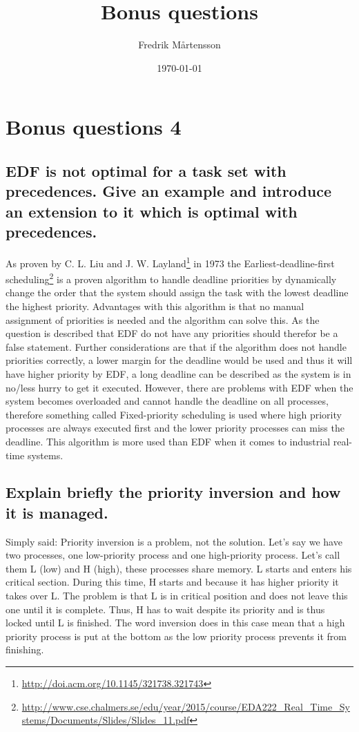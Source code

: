 \documentclass[../../../main.tex]{subfiles}
\title{Bonus questions}
\author{Fredrik Mårtensson}
\date{\today}
\begin{document}
\maketitle

\section{Bonus questions 4}
\subsection{EDF is not optimal for a task set with precedences. Give an example and introduce an extension to it which is optimal with precedences.} 
As proven by C. L. Liu and J. W. Layland\footnote{\url{http://doi.acm.org/10.1145/321738.321743}} in 1973 the Earliest-deadline-first scheduling\footnote{\url{http://www.cse.chalmers.se/edu/year/2015/course/EDA222_Real_Time_Systems/Documents/Slides/Slides_11.pdf}} is a proven algorithm to handle deadline priorities by dynamically change the order that the system should assign the task with the lowest deadline the highest priority. Advantages with this algorithm is that no manual assignment of priorities is needed and the algorithm can solve this. As the question is described that EDF do not have any priorities should therefor be a false statement. Further considerations are that if the algorithm does not handle priorities correctly, a lower margin for the deadline would be used and thus it will have higher priority by EDF, a long deadline can be described as the system is in no/less hurry to get it executed.
\newline\newline
However, there are problems with EDF when the system becomes overloaded and cannot handle the deadline on all processes, therefore something called Fixed-priority scheduling is used where high priority processes are always executed first and the lower priority processes can miss the deadline. This algorithm is more used than EDF when it comes to industrial real-time systems.

\subsection{Explain briefly the priority inversion and how it is managed.}
Simply said: Priority inversion is a problem, not the solution. 
Let's say we have two processes, one low-priority process and one high-priority process. Let's call them L (low) and H (high), these processes share memory. L starts and enters his critical section. During this time, H starts and because it has higher priority it takes over L. The problem is that L is in critical position and does not leave this one until it is complete. Thus, H has to wait despite its priority and is thus locked until L is finished. The word inversion does in this case mean that a high priority process is put at the bottom as the low priority process prevents it from finishing.
\newpage
\end{document}
